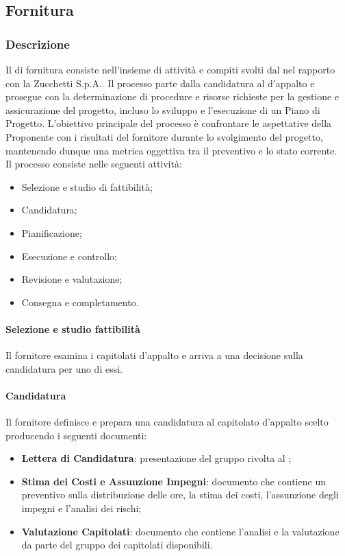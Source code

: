 \subsection{Fornitura}\label{fornitura}

\subsubsection{Descrizione}
Il  di fornitura consiste nell'insieme di attività e compiti svolti dal  nel rapporto con la  Zucchetti S.p.A.. Il processo parte dalla candidatura al  d'appalto e prosegue con la determinazione di procedure e risorse richieste per la gestione e assicurazione del progetto, incluso lo sviluppo e l'esecuzione di un Piano di Progetto.
L'obiettivo principale del processo è confrontare le aspettative della Proponente con i risultati del fornitore durante lo svolgimento del progetto, mantenendo dunque una metrica oggettiva tra il preventivo e lo stato corrente.\\
Il processo consiste nelle seguenti attività:
\begin{itemize}
  \item Selezione e studio di fattibilità;
  \item Candidatura;
  \item Pianificazione;
  \item Esecuzione e controllo;
  \item Revisione e valutazione;
  \item Consegna e completamento.
\end{itemize}

\paragraph{Selezione e studio fattibilità}
Il fornitore esamina i capitolati d'appalto e arriva a una decisione sulla candidatura per uno di essi.

\paragraph{Candidatura}
Il fornitore definisce e prepara una candidatura al capitolato d'appalto scelto producendo i seguenti documenti:
\begin{itemize}
  \item \textbf{Lettera di Candidatura}: presentazione del gruppo rivolta al ;
  \item \textbf{Stima dei Costi e Assunzione Impegni}: documento che contiene un preventivo sulla distribuzione delle ore, la stima dei costi, l'assunzione degli impegni e l'analisi dei rischi;
  \item \textbf{Valutazione Capitolati}: documento che contiene l'analisi e la valutazione da parte del gruppo dei capitolati disponibili.
\end{itemize}

